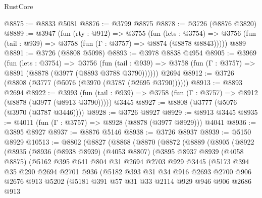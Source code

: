 \begin{lexlean}{RustCore}
\begin{coremodule}
@8875 := @8833 @5081
@8876 := @3799 @8875
@8878 := @3726 (@8876 @3820)
@8889 := @3947
    (fun (rty : @912) =>
    @3755
      (fun (lets : @3754) =>
      @3756 (fun (tail : @939) => @3758 (fun (Γ : @3757) => @8874 (@8878 @8843)))))
    @889
@8891 := @3726 (@8808 @5098)
@8893 := @3978 @8838 @4954
@8905 := @3969
    (fun (lets : @3754) =>
    @3756
      (fun (tail : @939) => @3758 (fun (Γ : @3757) => @8891 (@8878 (@3977 (@8893 @3788 @3790))))))
    @2694
@8912 := @3726 (@8808 (@3777 (@5076 (@3970 (@3787 (@2695 @3790))))))
@8913 := @8893 @2694
@8922 := @3993
    (fun (tail : @939) => @3758 (fun (Γ : @3757) => @8912 (@8878 (@3977 (@8913 @3790)))))
    @3445
@8927 := @8808 (@3777 (@5076 (@3970 (@3787 @3446))))
@8928 := @3726 @8927
@8929 := @8913 @3445
@8935 := @4011 (fun (Γ : @3757) => @8928 (@8878 (@3977 @8929))) @4041
@8936 := @3895 @8927
@8937 := @8876 @5146
@8938 := @3726 @8937
@8939 := @5150 @8929
@10513 := @8802
    (@8827
      (@8868
        (@8870
          (@8872
            (@8889
              (@8905
                (@8922
                  (@8935
                    (@8936
                      (@8938 @8939)
                      (@4053 @8807)
                      (@3895
                        @8937
                        @8939
                        (@4058 @8875)
                        (@5162
                          @395
                          @641
                          @804
                          @31
                          @2694
                          @2703
                          @929
                          @3445
                          (@5173
                            @394
                            @35
                            @290
                            @2694
                            @2701
                            @936
                            (@5182
                              @393
                              @31
                              @34
                              @916
                              @2693
                              @2700
                              @906
                              @2676
                              @913
                              @5202
                              (@5181
                                @391
                                @57
                                @31
                                @33
                                @2114
                                @929
                                @946
                                @906
                                @2686
                                @913

\end{coremodule}
\end{lexlean}
